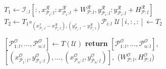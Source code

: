 \begin{algorithm}[t]
\begin{algorithmic}[1]
    \label{alg:line:memcpy_loop}
        \State $T_1 \gets \mathcal{I}_{:l}[:,x^\mathcal{R}_{\mathcal{P}_i:l}:x^\mathcal{R}_{\mathcal{P}_i:l}+W^\mathcal{R}_{\mathcal{P}:l},y^\mathcal{R}_{\mathcal{P}_i:l}:y^\mathcal{R}_{\mathcal{P}_i:l}+H^\mathcal{R}_{\mathcal{P}:l}]$ 
        \State $T_2 \gets T_1 \bm\circ_{(x^\mathcal{I}_{\mathcal{P}_i:l}-x^\mathcal{R}_{\mathcal{P}_i:l}),(y^\mathcal{I}_{\mathcal{P}_i:l}-y^\mathcal{R}_{\mathcal{P}_i:l})} \mathcal{P}_{i:l}$
        \State $\mathcal{U}[i,:,:] \gets T_2$
    \EndFor

    \State $[\mathcal{P}^\mathcal{O}_{1:l},...,\mathcal{P}^\mathcal{O}_{n:l}] \gets T(\mathcal{U})$ 
    \State \textbf{return} $[\mathcal{P}^\mathcal{O}_{1:l},...,\mathcal{P}^\mathcal{O}_{n:l}]$,
    \State \hspace*{5mm} $[(x^\mathcal{O}_{\mathcal{P}_1:l},y^\mathcal{O}_{\mathcal{P}_1:l}),...,(x^\mathcal{O}_{\mathcal{P}_n:l},y^\mathcal{O}_{\mathcal{P}_n:l})],$ ($W^\mathcal{O}_{\mathcal{P}:l},H^\mathcal{O}_{\mathcal{P}:l}$) 
    \EndProcedure
    \end{algorithmic}

    


\end{algorithm}
